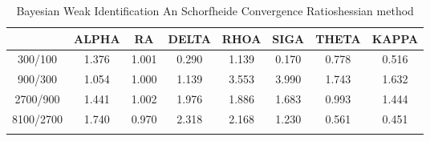 \documentclass[a4paper,10pt]{article}
\begin{document}
\centering
\begin{longtable}{cccccccc}
\toprule
 & ALPHA & RA & DELTA & RHOA & SIGA & THETA & KAPPA \\
\midrule
300/100 & 1.376 & 1.001 & 0.290 & 1.139 & 0.170 & 0.778 & 0.516 \\
900/300 & 1.054 & 1.000 & 1.139 & 3.553 & 3.990 & 1.743 & 1.632 \\
2700/900 & 1.441 & 1.002 & 1.976 & 1.886 & 1.683 & 0.993 & 1.444 \\
8100/2700 & 1.740 & 0.970 & 2.318 & 2.168 & 1.230 & 0.561 & 0.451 \\
\bottomrule
\caption{Bayesian Weak Identification An Schorfheide Convergence Ratioshessian method}
\label{table:tbl:WeakAnSchoConvergenceRatios_hessian}
\end{longtable}
\end{document}
